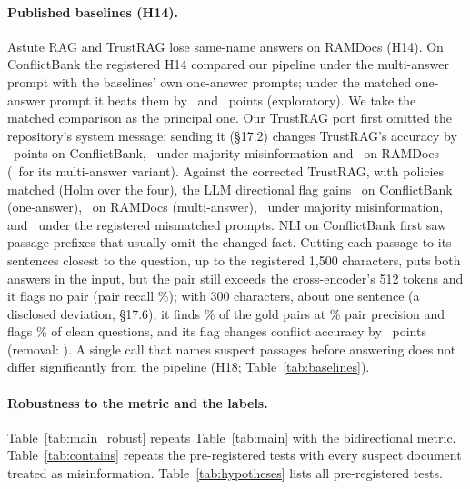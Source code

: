 \paragraph{Published baselines (H14).} Astute RAG \citep{wang2025astute} and TrustRAG \citep{zhou2025trustrag} lose same-name answers
on RAMDocs (H14). On ConflictBank the registered H14 compared our pipeline under the multi-answer prompt with the
baselines' own one-answer prompts; under the matched one-answer prompt it beats them by \hFourteenMatchedAst\ and
\hFourteenMatchedTr\ points (exploratory). We take the matched comparison as the principal one. Our TrustRAG port
first omitted the repository's system message; sending it (\S17.2) changes TrustRAG's accuracy by \blTrustSysCb\
points on ConflictBank, \blTrustSysMj\ under majority misinformation and \blTrustSysRd\ on RAMDocs (\blTrustSysRdMulti\
for its multi-answer variant). Against the corrected TrustRAG, with policies matched (Holm over the four), the LLM
directional flag gains \blHFourteenCbs\ on ConflictBank (one-answer), \blHFourteenRd\ on RAMDocs (multi-answer),
\blHFourteenMj\ under majority misinformation, and \blHFourteenCb\ under the registered mismatched prompts.
NLI on ConflictBank first saw passage prefixes that usually omit the changed fact. Cutting each passage to its
sentences closest to the question, up to the registered 1,500 characters, puts both answers in the input, but the
pair still exceeds the cross-encoder's 512 tokens and it flags no pair (pair recall \detNliWinRecall\%); with
300 characters, about one sentence (a disclosed deviation, \S17.6), it finds \detNliSentRecall\% of the gold pairs at
\detNliSentPrec\% pair precision and flags \detNliSentCleanFpr\% of clean questions, and its flag changes conflict
accuracy by \blNliSentFlag\ points (removal: \blNliSentRem). A single call that names suspect passages before
answering does not differ significantly from the pipeline (H18; Table~\ref{tab:baselines}).

\paragraph{Robustness to the metric and the labels.}
Table~\ref{tab:main_robust} repeats Table~\ref{tab:main} with the bidirectional metric. Table~\ref{tab:contains}
repeats the pre-registered tests with every suspect document treated as misinformation. Table~\ref{tab:hypotheses}
lists all pre-registered tests.

